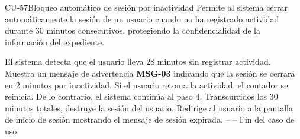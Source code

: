 \begin{UseCase}{CU-57}{Bloqueo automático de sesión por inactividad}{
	Permite al sistema cerrar automáticamente la sesión de un usuario cuando no ha registrado actividad durante 30 minutos consecutivos, protegiendo la confidencialidad de la información del expediente.
}
\end{UseCase}

\begin{UCtrayectoria}
	\UCpaso El sistema detecta que el usuario lleva 28 minutos sin registrar actividad.
	\UCpaso Muestra un mensaje de advertencia \textbf{MSG-03} indicando que la sesión se cerrará en 2 minutos por inactividad.
	\UCpaso[\UCactor] Si el usuario retoma la actividad, el contador se reinicia. De lo contrario, el sistema continúa al paso 4.
	\UCpaso Transcurridos los 30 minutos totales, destruye la sesión del usuario.
	\UCpaso Redirige al usuario a la pantalla de inicio de sesión mostrando el mensaje de sesión expirada.
	\UCpaso[] -- -- Fin del caso de uso.
\end{UCtrayectoria}
